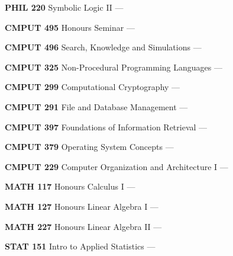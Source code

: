 \begin{cventries}
{\begin{multicols}{2}
\begin{cvitems}
          \vspace{0.5mm}
        \item {\textbf{PHIL 220} Symbolic Logic II --- }
          \vspace{1.5mm}
        \item {\textbf{CMPUT 495} Honours Seminar --- }
        \item {\textbf{CMPUT 496} Search, Knowledge and Simulations --- }
          \vspace{0.5mm}
        \item {\textbf{CMPUT 325} Non-Procedural Programming Languages --- }
          \vspace{0.5mm}
        \item {\textbf{CMPUT 299} Computational Cryptography --- }
          \vspace{0.5mm}
        \item {\textbf{CMPUT 291} File and Database Management --- }
          \vspace{0.5mm}
        \item {\textbf{CMPUT 397} Foundations of Information Retrieval --- }
          \vspace{0.5mm}
        \item {\textbf{CMPUT 379} Operating System Concepts --- }
          \vspace{0.5mm}
        \item {\textbf{CMPUT 229} Computer Organization and Architecture I --- }
          \vspace{1.5mm}
        \item {\textbf{MATH 117} Honours Calculus I --- }
          \vspace{0.5mm}
        \item {\textbf{MATH 127} Honours Linear Algebra I --- }
          \vspace{0.5mm}
        \item {\textbf{MATH 227} Honours Linear Algebra II --- }
          \vspace{0.5mm}
        \item {\textbf{STAT 151} Intro to Applied Statistics --- }

\end{cvitems}
\end{multicols}}
\end{cventries}

